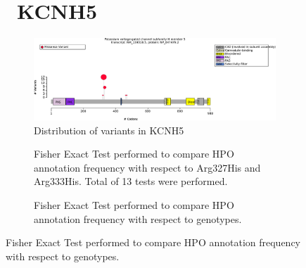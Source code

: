 \begin{figure}[htbp]
\section*{ KCNH5}
\centering
\begin{subfigure}[b]{0.95\textwidth}
\centering
\includegraphics[width=\textwidth]{ img/KCNH5_protein_diagram.pdf} 
\captionsetup{justification=raggedright,singlelinecheck=false}
\caption{Distribution of variants in KCNH5}
\end{subfigure}

\vspace{2em}

\begin{subfigure}[b]{0.95\textwidth}
\centering
{}
\captionsetup{justification=raggedright,singlelinecheck=false}
\caption{Fisher Exact Test performed to compare HPO annotation frequency with respect to Arg327His and Arg333His. Total of
        13 tests were performed.}
\end{subfigure}
\vspace{2em}
\begin{subfigure}[b]{0.95\textwidth}
\centering
{}
\captionsetup{justification=raggedright,singlelinecheck=false}
\caption{Fisher Exact Test performed to compare HPO annotation frequency with respect to genotypes.}
\end{subfigure}


\end{figure}
